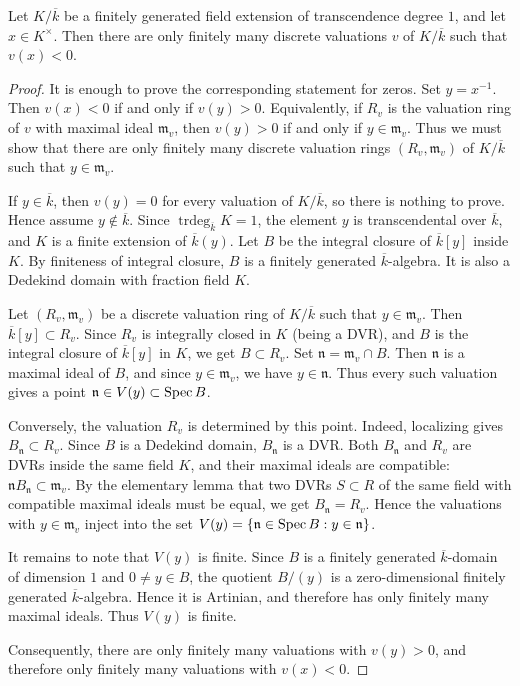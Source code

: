 \documentclass[12pt]{article}
\begin{document}
\begin{theorem}
    Let $K/\overline{k}$ be a finitely generated field extension of transcendence degree $1$, and let $x\in K^\times$.
    Then there are only finitely many discrete valuations $v$ of $K/\overline{k}$ such that $v(x)<0$.
\end{theorem}
\begin{proof}
    It is enough to prove the corresponding statement for zeros. Set $y=x^{-1}$. Then $v(x)<0$ if and only if $v(y)>0$. Equivalently, if $R_v$ is the valuation ring of $v$ with maximal ideal $\mathfrak m_v$, then $v(y)>0$ if and only if $y\in \mathfrak m_v$. Thus we must show that there are only finitely many discrete valuation rings $(R_v,\mathfrak m_v)$ of $K/\overline{k}$ such that $y\in \mathfrak m_v$.

    If $y\in \overline{k}$, then $v(y)=0$ for every valuation of $K/\overline{k}$, so there is nothing to prove. Hence assume $y\notin \overline{k}$. Since $\operatorname{trdeg}_{\overline{k}}K=1$, the element $y$ is transcendental over $\overline{k}$, and $K$ is a finite extension of $\overline{k}(y)$. Let $B$ be the integral closure of $\overline{k}[y]$ inside $K$. By finiteness of integral closure, $B$ is a finitely generated $\overline{k}$-algebra. It is also a Dedekind domain with fraction field $K$.

    Let $(R_v,\mathfrak m_v)$ be a discrete valuation ring of $K/\overline{k}$ such that $y\in \mathfrak m_v$. Then $\overline{k}[y]\subset R_v$. Since $R_v$ is integrally closed in $K$ (being a DVR), and $B$ is the integral closure of $\overline{k}[y]$ in $K$, we get $B\subset R_v$. Set $\mathfrak n=\mathfrak m_v\cap B$. Then $\mathfrak n$ is a maximal ideal of $B$, and since $y\in \mathfrak m_v$, we have $y\in \mathfrak n$. Thus every such valuation gives a point $\mathfrak n\in V(y)\subset \operatorname{Spec} B$.

    Conversely, the valuation $R_v$ is determined by this point. Indeed, localizing gives $B_{\mathfrak n}\subset R_v$. Since $B$ is a Dedekind domain, $B_{\mathfrak n}$ is a DVR. Both $B_{\mathfrak n}$ and $R_v$ are DVRs inside the same field $K$, and their maximal ideals are compatible: $\mathfrak nB_{\mathfrak n}\subset \mathfrak m_v$. By the elementary lemma that two DVRs $S\subset R$ of the same field with compatible maximal ideals must be equal, we get $B_{\mathfrak n}=R_v$. Hence the valuations with $y\in \mathfrak m_v$ inject into the set $V(y)=\{\mathfrak n\in \operatorname{Spec} B : y\in \mathfrak n\}$.

    It remains to note that $V(y)$ is finite. Since $B$ is a finitely generated $\overline{k}$-domain of dimension $1$ and $0\neq y\in B$, the quotient $B/(y)$ is a zero-dimensional finitely generated $\overline{k}$-algebra. Hence it is Artinian, and therefore has only finitely many maximal ideals. Thus $V(y)$ is finite.

    Consequently, there are only finitely many valuations with $v(y)>0$, and therefore only finitely many valuations with $v(x)<0$.
\end{proof}
\end{document}
